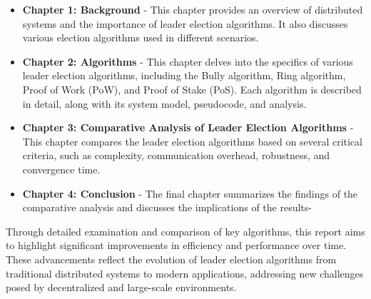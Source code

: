 \begin{itemize}
    \item \textbf{Chapter 1: Background} - This chapter provides an overview of distributed systems and the importance of leader election algorithms. It also discusses various election algorithms used in different scenarios.
    \item \textbf{Chapter 2: Algorithms} - This chapter delves into the specifics of various leader election algorithms, including the Bully algorithm, Ring algorithm, Proof of Work (PoW), and Proof of Stake (PoS). Each algorithm is described in detail, along with its system model, pseudocode, and analysis.
    \item \textbf{Chapter 3: Comparative Analysis of Leader Election Algorithms} - This chapter compares the leader election algorithms based on several critical criteria, such as complexity, communication overhead, robustness, and convergence time.
    \item \textbf{Chapter 4: Conclusion} - The final chapter summarizes the findings of the comparative analysis and discusses the implications of the results-
\end{itemize}
Through detailed examination and comparison of key algorithms, this report aims to highlight significant improvements in efficiency and performance over time. These advancements reflect the evolution of leader election algorithms from traditional distributed systems to modern applications, addressing new challenges posed by decentralized and large-scale environments.
